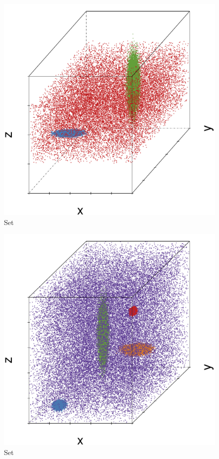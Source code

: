 \begin{subfigure}{0.18\textwidth}
	\centering
	\includegraphics[width=\textwidth]{3/img/datasetplot_baakman_2_60000.pdf}
	\caption{Set \baakmanTwo}
	\label{fig:3:simulated:datasets:baakman2}
\end{subfigure}	
\begin{subfigure}{0.18\textwidth}
	\centering
	\includegraphics[width=\textwidth]{3/img/datasetplot_baakman_3_120000.pdf}
	\caption{Set \baakmanThree}
	\label{fig:3:simulated:datasets:baakman3}
\end{subfigure}				
